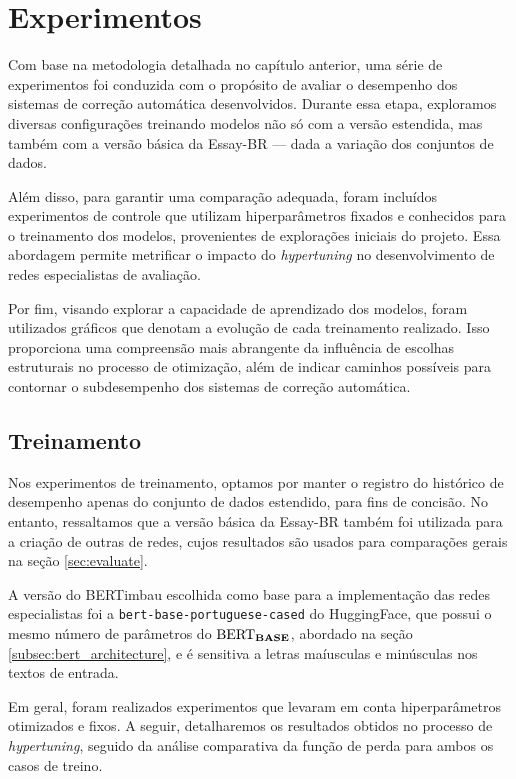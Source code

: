 \chapter{Experimentos}

Com base na metodologia detalhada no capítulo anterior, uma série de experimentos foi conduzida com o propósito de avaliar o desempenho dos sistemas de correção automática desenvolvidos. Durante essa etapa, exploramos diversas configurações treinando modelos não só com a versão estendida, mas também com a versão básica da Essay-BR --- dada a variação dos conjuntos de dados.

Além disso, para garantir uma comparação adequada, foram incluídos experimentos de controle que utilizam hiperparâmetros fixados e conhecidos para o treinamento dos modelos, provenientes de explorações iniciais do projeto. Essa abordagem permite metrificar o impacto do \textit{hypertuning} no desenvolvimento de redes especialistas de avaliação.

Por fim, visando explorar a capacidade de aprendizado dos modelos, foram utilizados gráficos que denotam a evolução de cada treinamento realizado. Isso proporciona uma compreensão mais abrangente da influência de escolhas estruturais no processo de otimização, além de indicar caminhos possíveis para contornar o subdesempenho dos sistemas de correção automática.

\section{Treinamento}

Nos experimentos de treinamento, optamos por manter o registro do histórico de desempenho apenas do conjunto de dados estendido, para fins de concisão. No entanto, ressaltamos que a versão básica da Essay-BR também foi utilizada para a criação de outras de redes, cujos resultados são usados para comparações gerais na seção \ref{sec:evaluate}.

A versão do BERTimbau escolhida como base para a implementação das redes especialistas foi a \texttt{bert-base-portuguese-cased} do HuggingFace, que possui o mesmo número de parâmetros do $\text{BERT}_{\textbf{\text{BASE}}}$, abordado na seção \ref{subsec:bert_architecture}, e é sensitiva a letras maíusculas e minúsculas nos textos de entrada.

Em geral, foram realizados experimentos que levaram em conta hiperparâmetros otimizados e fixos. A seguir, detalharemos os resultados obtidos no processo de \textit{hypertuning}, seguido da análise comparativa da função de perda para ambos os casos de treino.

